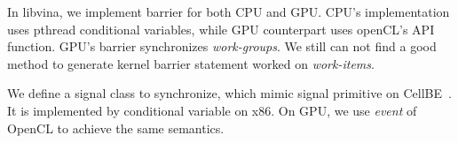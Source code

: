 In libvina, we implement barrier for both CPU and GPU. CPU's
implementation uses pthread conditional variables, while GPU counterpart
uses openCL's API function. GPU's barrier synchronizes
\emph{work-groups}. We still can not find a good method to generate kernel
barrier statement worked on \emph{work-items}.

We define a signal class to synchronize, which mimic
signal primitive on CellBE~\cite{cellnetwork}. It is implemented by
conditional variable on x86. On GPU, we use \emph{event} of OpenCL to
achieve the same semantics.

